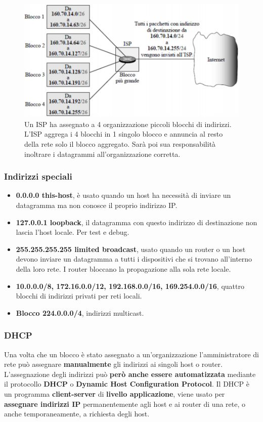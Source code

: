 \documentclass[11pt,a4paper,oneside]{book}
\theoremstyle{definition}
\begin{document}
\begin{figure}[!h]
	\includegraphics[scale=0.4]{Immagini/Ip_aggr.png}
	\centering
	\caption{Un ISP ha assegnato a 4 organizzazione piccoli blocchi
		di indirizzi. L’ISP aggrega i 4 blocchi in 1 singolo blocco e
		annuncia al resto della rete solo il blocco aggregato. Sarà poi sua responsabilità inoltrare i datagrammi all'organizzazione corretta.}
\end{figure}

\pagebreak

\subsubsection{Indirizzi speciali}

\begin{itemize}
	\item \textbf{0.0.0.0 this-host}, è usato quando un host ha necessità di inviare un
	      datagramma ma non conosce il proprio indirizzo IP.
	\item \textbf{127.0.0.1 loopback}, il datagramma con questo indirizzo di
	      destinazione non lascia l’host locale. Per test e debug.
	\item \textbf{255.255.255.255 limited broadcast}, usato quando un router o un
	      host devono inviare un datagramma a tutti i dispositivi che si
	      trovano all’interno della loro rete. I router bloccano la propagazione alla
	      sola rete locale.
	\item  \textbf{10.0.0.0/8, 172.16.0.0/12, 192.168.0.0/16,
		      169.254.0.0/16}, quattro blocchi di indirizzi privati per reti locali.
	\item \textbf{Blocco 224.0.0.0/4}, indirizzi multicast.
\end{itemize}


\subsubsection{DHCP}
Una volta che un blocco è stato assegnato a un'organizzazione l'amministratore di rete può assegnare \textbf{manualmente} gli indirizzi ai singoli host o router. L'assegnazione degli indirizzi può \textbf{però anche essere automatizzata} mediante il protocollo \textbf{DHCP} o \textbf{Dynamic Host Configuration Protocol}. Il DHCP è un programma \textbf{client-server} di \textbf{livello applicazione}, viene usato per \textbf{assegnare indirizzi IP} permanentemente agli host e ai router di una rete, o anche temporaneamente, a richiesta degli host.
\end{document}
